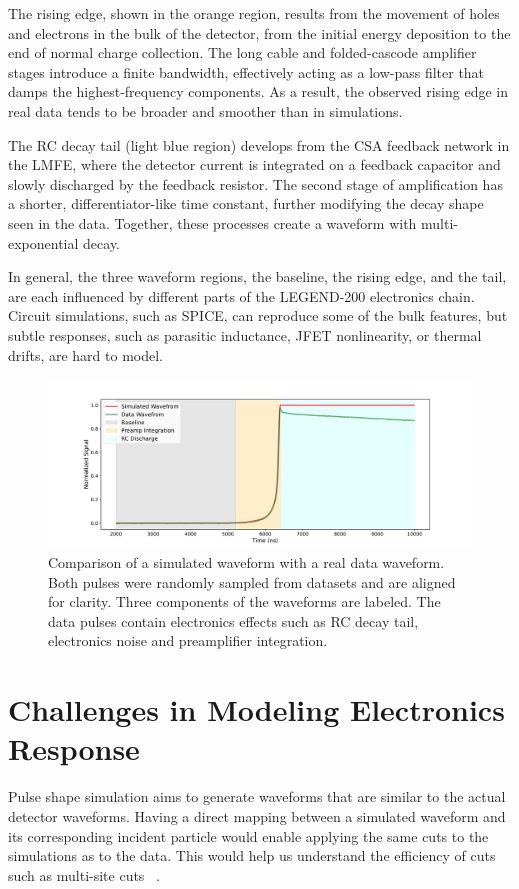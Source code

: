 The rising edge, shown in the orange region, results from the movement of holes and electrons in the bulk of the detector, from the initial energy deposition to the end of normal charge collection. The long cable and folded-cascode amplifier stages introduce a finite bandwidth, effectively acting as a low-pass filter that damps the highest-frequency components. As a result, the observed rising edge in real data tends to be broader and smoother than in simulations. 

The RC decay tail (light blue region) develops from the CSA feedback network in the LMFE, where the detector current is integrated on a feedback capacitor and slowly discharged by the feedback resistor. The second stage of amplification has a shorter, differentiator-like time constant, further modifying the decay shape seen in the data. Together, these processes create a waveform with multi-exponential decay. 

In general, the three waveform regions, the baseline, the rising edge, and the tail, are each influenced by different parts of the LEGEND-200 electronics chain. Circuit simulations, such as SPICE, can reproduce some of the bulk features, but subtle responses, such as parasitic inductance, JFET nonlinearity, or thermal drifts, are hard to model.

\begin{figure}[!htb]%
    \includegraphics[width=\linewidth,trim={2.5cm 0pc 3.5cm 0pc},clip]{ch6/figs/wf_comp_sim_data.pdf}
    \caption{Comparison of a simulated waveform with a real data waveform. Both pulses were randomly sampled from datasets and are aligned for clarity. Three components of the waveforms are labeled. The data pulses contain electronics effects such as RC decay tail, electronics noise and preamplifier integration.}
    \label{fig:sim_data_comp}
\end{figure}

\section{Challenges in Modeling Electronics Response}
Pulse shape simulation aims to generate waveforms that are similar to the actual detector waveforms. Having a direct mapping between a simulated waveform and its corresponding incident particle would enable applying the same cuts to the simulations as to the data. This would help us understand the efficiency of cuts such as multi-site cuts ~\cite{AvsE}.  

